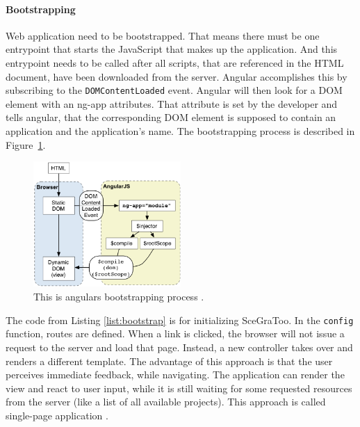 \paragraph{Bootstrapping}
\label{par:Bootstrapping and Routing}

Web application need to be bootstrapped. That means there must be one entrypoint
that starts the JavaScript that makes up the application. And this entrypoint
needs to be called after all scripts, that are referenced in the \gls{HTML}
document, have been downloaded from the server. Angular accomplishes this by
subscribing to the \texttt{DOMContentLoaded} event. Angular will then look for a
\gls{DOM} element with an ng-app attributes. That attribute is set by the
developer and tells angular, that the corresponding DOM element is supposed to
contain an application and the application's name. The bootstrapping process is
described in Figure~\ref{fig:angularbootstrap}.

\begin{figure}
  \centering
  \includegraphics[width=0.5\textwidth]{../assets/concepts-startup.png}
  \caption{This is angulars bootstrapping process \cite{angularbootstrap}.}
  \label{fig:angularbootstrap}
\end{figure}

The code from Listing \ref{list:bootstrap} is for initializing SceGraToo. In the \texttt{config}
function, routes are defined. When a link is clicked, the browser will not issue a
request to the server and load that page. Instead, a new controller takes over and
renders a different template. The advantage of this approach is that the user
perceives immediate feedback, while navigating. The application can render the view and
react to user input, while it is still waiting for some requested resources from
the server (like a list of all available projects). This approach is called
single-page application \cite{Mikowski:2013:SPW:2663433}.

